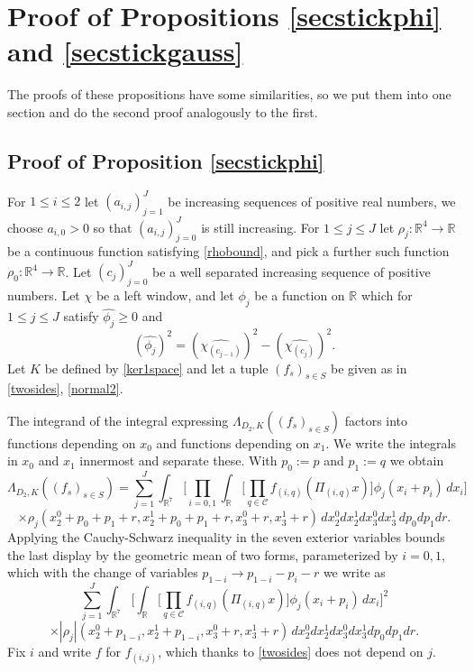 \documentclass[12pt,reqno]{amsart}
\theoremstyle{plain}
\theoremstyle{definition}
\numberwithin{equation}{section}
\newcommand{\R}{{\mathbb R}}
\def\wh{\widehat}
\begin{document}
 


\section{Proof of Propositions  \ref{secstickphi} and \ref{secstickgauss}}
\label{sec:secstick}

The proofs of these propositions have some similarities, so we put them into 
one section and do the second proof analogously to the first. 

 

\subsection{Proof of Proposition  \ref{secstickphi}}\label{sec:9.1}

For $1\le i\le 2$ let  $(a_{i,j})_{j=1}^{J}$ be increasing sequences of positive real numbers, we choose $a_{i,0}>0$ so that  $(a_{i,j})_{j=0}^{J}$
is still increasing.
For $1\leq j \leq J$ let $\rho_{j}:\R^4\to \R$ be a continuous function satisfying \eqref{rhobound}, and pick a further such function 
$\rho_{0}:\R^4\to \R$.
Let $(c_j)_{j=0}^J$ be a well separated increasing sequence of positive numbers. Let $\chi$ be a left window, and let $\phi_{j}$ be a function on $\R$ which for $1\le j \le J$ satisfy $\wh{\phi_j} \geq 0$ and  
 \[(\wh{\phi_{j}})^2 = (\wh{{\chi}_{(c_{j-1})}})^2 
 - (\wh{{\chi}_{(c_j)}})^2. \]
 Let $K$ be defined by \eqref{ker1space} and let a tuple $(f_s)_{s\in S}$ be given as in \eqref{twosides}, \eqref{normal2}.



The integrand of the integral expressing $\Lambda_{D_2,K}((f_s)_{s\in S})$
factors into functions depending on $x_0$
and functions depending on $x_1$. We 
write the integrals in $x_0$ and $x_1$ innermost and separate
these. With $p_0:=p$ and $p_1:=q$ we obtain
\begin{equation}\label{firstlambda29}
\Lambda_{D_2,K}((f_s)_{s\in S})=
\sum_{j=1}^J  \int_{\R^7}  \Big[\prod_{i=0,1} \int_{\R} \Big[ \prod_{q\in \mathcal{C}} f_{(i,q)}(\Pi_{(i,q)}x) \Big] \phi_{j}(x_i+p_i) \,dx_i\Big]    
\end{equation}
\[ \times \rho_{j}(x_2^0+p_0+p_1+r,x_2^1+p_0+p_1+r,x_3^0+r,x_3^1+r)  \, dx_2^0 dx_2^1 dx_3^0 dx_3^1\,dp_0 dp_1 dr  . \] 
Applying the Cauchy-Schwarz inequality in the seven exterior variables
 bounds the last display by the geometric mean of two forms, parameterized
 by $i=0,1$, which with the change of variables $p_{1-i} \to p_{1-i}-p_i-r$ we write as
\[\sum_{j=1}^J \int_{\R^7}  \Big[ \int_{\R} \Big[ \prod_{q\in \mathcal{C}} f_{(i,q)}(\Pi_{(i,q)}x) \Big] \phi_{j}(x_i+p_i)\, dx_i\Big]^2      \]
\begin{equation}
    \label{formaftercs1} \times |\rho_{j}|(x_2^0+p_{1-i},x_{2}^1+p_{1-i},x_3^0+r,x_3^1+r)  \, dx_2^0dx_2^1dx_3^0dx_3^1dp_0dp_1dr .
\end{equation}
Fix $i$ and write $f$ for $f_{(i,j)}$, which thanks to \eqref{twosides}
does not depend on $j$.
\end{document}
